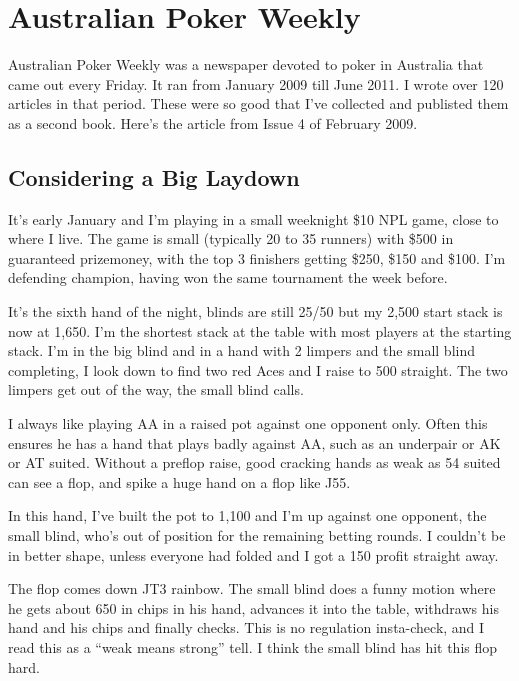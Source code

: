 \chapter{Australian Poker Weekly}


Australian Poker Weekly was a newspaper devoted to poker in Australia
that came out every Friday. It ran from January 2009 till June 2011.
I wrote over 120 articles in that period. These were so good that
I've collected and publisted them as a second book.
Here's the article from Issue 4 of February 2009.

\section{Considering a Big Laydown}

It's early January and I'm playing in a small weeknight \$10 NPL game,
close to where I live. The game is small (typically 20 to 35 runners) with
\$500 in guaranteed prizemoney, with the top 3 finishers getting \$250, \$150
and \$100. I'm defending champion, having won the same tournament
the week before.

It's the sixth hand of the night, blinds are still 25/50 but
my 2,500 start stack is now at 1,650. I'm the shortest stack at the
table with most players at the starting stack. I'm in the big blind and
in a hand with 2 limpers and the small blind completing, I look down to
find two red Aces and I raise to 500 straight. The two limpers get out
of the way, the small blind calls.

I always like playing AA in a raised pot against one opponent only.
Often this ensures he has a hand that plays badly against AA, such as
an underpair or AK or AT suited. Without a preflop raise, good
cracking hands as weak as 54 suited can see a flop, and spike a huge
hand on a flop like J55.

In this hand, I've built the pot to 1,100 and I'm up against one
opponent, the small blind, who's out of position for the remaining
betting rounds. I couldn't be in better shape, unless everyone had
folded and I got a 150 profit straight away.

The flop comes down JT3 rainbow. The small blind does a funny motion
where he gets about 650 in chips in his hand, advances it into the
table, withdraws his hand and his chips and finally checks. This is
no regulation insta-check, and I read this as a ``weak means strong''
tell. I think the small blind has hit this flop hard.

